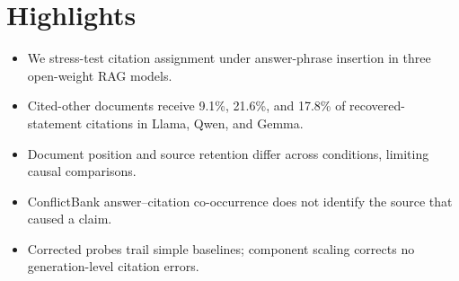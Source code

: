 \documentclass[11pt]{article}
\begin{document}
\section*{Highlights}

\begin{itemize}
    \item We stress-test citation assignment under answer-phrase insertion in three open-weight RAG models.
    \item Cited-other documents receive 9.1\%, 21.6\%, and 17.8\% of recovered-statement citations in Llama, Qwen, and Gemma.
    \item Document position and source retention differ across conditions, limiting causal comparisons.
    \item ConflictBank answer--citation co-occurrence does not identify the source that caused a claim.
    \item Corrected probes trail simple baselines; component scaling corrects no generation-level citation errors.
\end{itemize}
\end{document}
